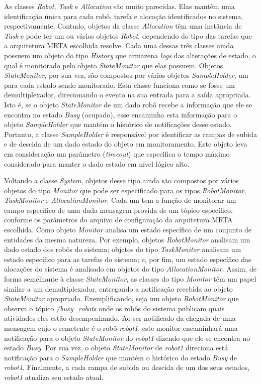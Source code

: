         As classes \textit{Robot}, \textit{Task} e \textit{Allocation} são muito parecidas. Elas mantêm uma identificação única para cada robô, tarefa e alocação identificados no sistema, respectivamente. Contudo, objetos da classe \textit{Allocation} têm uma instância de \textit{Task} e pode ter um ou vários objetos \textit{Robot}, dependendo do tipo das tarefas que a arquitetura MRTA escolhida resolve. Cada uma dessas três classes ainda possuem um objeto do tipo \textit{History} que armazena \textit{logs} das alterações de estado, o qual é monitorado pelo objeto \textit{StateMonitor} que elas possuem. Objetos \textit{StateMonitor}, por sua vez, são compostos por vários objetos \textit{SampleHolder}, um para cada estado sendo monitorado. Esta classe funciona como se fosse um demultiplexador, direcionando o evento na sua entrada para a saída apropriada. Isto é, se o objeto \textit{StateMonitor} de um dado robô recebe a informação que ele se encontra no estado \textit{Busy} (ocupado), esse encaminha esta informação para o objeto \textit{SampleHolder} que mantém o histórico de notificações desse estado. Portanto, a classe \textit{SampleHolder} é responsável por identificar as rampas de subida e de descida de um dado estado do objeto em monitoramento. Este objeto leva em consideração um parâmetro (\textit{timeout}) que especifica o tempo máximo considerado para manter o dado estado em nível lógico alto.
        
        Voltando a classe \textit{System}, objetos desse tipo ainda são compostos por vários objetos do tipo \textit{Monitor} que pode ser especificado para os tipos \textit{RobotMonitor}, \textit{TaskMonitor} e \textit{AllocationMonitor}. Cada um tem a função de monitorar um campo específico de uma dada mensagem provida de um tópico específico, conforme os parâmetros do arquivo de configuração da arquitetura MRTA escolhida.  Como objeto \textit{Monitor} analisa um estado específico de um conjunto de entidades da mesma natureza. Por exemplo, objetos \textit{RobotMonitor} analisam um dado estado dos robôs do sistema; objetos do tipo \textit{TaskMonitor} analisam um estado específico para as tarefas do sistema; e, por fim, um estado específico das alocações do sistema é analisado em objetos do tipo \textit{AllocationMonitor}. Assim, de forma semelhante à classe \textit{StateMonitor}, as classes do tipo \textit{Monitor} têm um papel similar a um demultiplexador, entregando a notificação recebida ao objeto \textit{StateMonitor} apropriado. Exemplificando, seja um objeto \textit{RobotMonitor} que observa o tópico \textit{/busy\_robots} onde os robôs do sistema publicam quais atividades eles estão desempenhando. Ao ser notificado da chegada de uma mensagem cujo o remetente é o robô \textit{robot1}, este monitor encaminhará uma notificação para o objeto \textit{StateMonitor} do \textit{robot1} dizendo que ele se encontra no estado \textit{Busy}. Por sua vez, o objeto \textit{StateMonitor} de \textit{robot1} direciona está notificação para o \textit{SampleHolder} que mantém o histórico do estado \textit{Busy} de \textit{robot1}. Finalmente, a cada rampa de subida ou descida de um dos seus estados, \textit{robot1} atualiza seu estado atual.
    